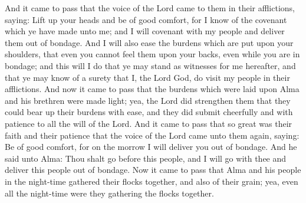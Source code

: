 And it came to pass that the voice of the Lord came to them in their afflictions, saying: Lift up your heads and be of good comfort, for I know of the covenant which ye have made unto me; and I will covenant with my people and deliver them out of bondage.
\bverse \iffalse And I will also ease the burdens which are put upon your shoulders, that even you cannot feel them upon your backs, even while you are in bondage; and this will I do that ye may stand as witnesses for me hereafter, and that ye may know of a surety that I, the Lord God, do visit my people in their afflictions. \fi
And I will also ease the burdens which are put upon your shoulders, that even you cannot feel them upon your backs, even while you are in bondage; and this will I do that ye may stand as witnesses for me hereafter, and that ye may know of a surety that I, the Lord God, do visit my people in their afflictions.
\bverse \iffalse And now it came to pass that the burdens which were laid upon Alma and his brethren were made light; yea, the Lord did strengthen them that they could bear up their burdens with ease, and they did submit cheerfully and with patience to all the will of the Lord. \fi
And now it came to pass that the burdens which were laid upon Alma and his brethren were made light; yea, the Lord did strengthen them that they could bear up their burdens with ease, and they did submit cheerfully and with patience to all the will of the Lord.
\bverse \iffalse And it came to pass that so great was their faith and their patience that the voice of the Lord came unto them again, saying: Be of good comfort, for on the morrow I will deliver you out of bondage. \fi
And it came to pass that so great was their faith and their patience that the voice of the Lord came unto them again, saying: Be of good comfort, for on the morrow I will deliver you out of bondage.
\bverse \iffalse And he said unto Alma: Thou shalt go before this people, and I will go with thee and deliver this people out of bondage. \fi
And he said unto Alma: Thou shalt go before this people, and I will go with thee and deliver this people out of bondage.
\bverse \iffalse Now it came to pass that Alma and his people in the night-time gathered their flocks together, and also of their grain; yea, even all the night-time were they gathering the flocks together. \fi
Now it came to pass that Alma and his people in the night-time gathered their flocks together, and also of their grain; yea, even all the night-time were they gathering the flocks together.

